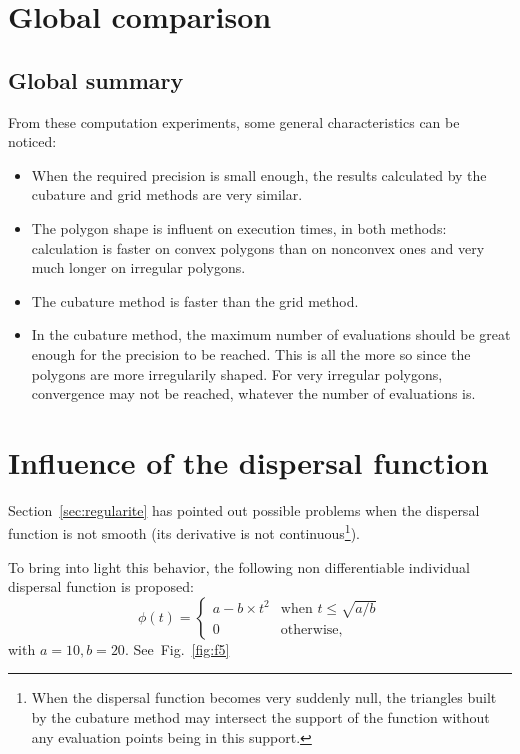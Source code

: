 \section{Global comparison}

\subsection{Global summary}
From these computation experiments, some general characteristics can be noticed:
\begin{itemize}
\item
When the required precision is small enough, the results calculated by the cubature
and grid methods are very similar.
\item
The polygon shape is influent on  execution times,
in both methods:
calculation is faster on convex polygons 
 than on nonconvex ones
and very much longer on irregular polygons.
\item
The cubature method is faster than the grid method.

\item
In the cubature method, the maximum number of
evaluations should be great enough for the precision
to be reached. This is all the more so since
 the polygons are more
irregularily
shaped.
For very irregular polygons, convergence may
 not be reached, whatever the number of evaluations is. 
\end{itemize}




\section{Influence of the dispersal function}

Section~\ref{sec:regularite} has pointed out possible 
problems  when the dispersal
  function is not smooth (its derivative is not continuous\footnote{
When the dispersal function becomes very suddenly  null, 
the triangles built by the cubature method may intersect
the support of the function
without any evaluation points being in this support.}).

To bring into light this behavior, the following
non differentiable  individual dispersal function
is proposed:
\[ \phi(t)= \left\{ \begin{array}{ll}
a-b\times t^2 & \mbox{when $t  \leq \sqrt{a/b}$}\\
0 & \mbox{otherwise,}
\end{array}
\right. \]
with  $a=10, b=20$.
See~Fig.~\ref{fig:f5}
